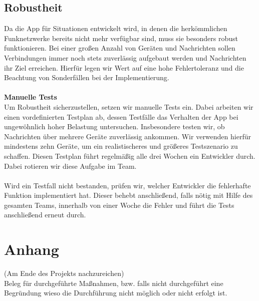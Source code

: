 \documentclass[accentcolor=tud0b,12pt,paper=a4]{tudreport}
\begin{document}
    \section{Robustheit}
      Da die App für Situationen entwickelt wird, in denen die herkömmlichen Funknetzwerke bereits nicht mehr verfügbar sind, muss sie besonders robust funktionieren. Bei einer großen Anzahl von Geräten und Nachrichten sollen Verbindungen immer noch stets zuverlässig aufgebaut werden und Nachrichten ihr Ziel erreichen. Hierfür legen wir Wert auf eine hohe Fehlertoleranz und die Beachtung von Sonderfällen bei der Implementierung.\\\\
      \textbf{Manuelle Tests}\\
      Um Robustheit sicherzustellen, setzen wir manuelle Tests ein. Dabei arbeiten wir einen vordefinierten Testplan ab, dessen Testfälle das Verhalten der App bei ungewöhnlich hoher Belastung untersuchen. Insbesondere testen wir, ob Nachrichten über mehrere Geräte zuverlässig ankommen. Wir verwenden hierfür mindestens zehn Geräte, um ein realistischeres und größeres Testszenario zu schaffen. Diesen Testplan führt regelmäßig alle drei Wochen ein Entwickler durch. Dabei rotieren wir diese Aufgabe im Team.\\\\
      Wird ein Testfall nicht bestanden, prüfen wir, welcher Entwickler die fehlerhafte Funktion implementiert hat. Dieser behebt anschließend, falls nötig mit Hilfe des gesamten Teams, innerhalb von einer Woche die Fehler und führt die Tests anschließend erneut durch.

\appendix
  \chapter{Anhang}
    (Am Ende des Projekts nachzureichen)\\
    Beleg für durchgeführte Maßnahmen, bzw. falls nicht durchgeführt eine Begründung wieso die Durchführung nicht möglich oder nicht erfolgt ist. \\
\end{document}
